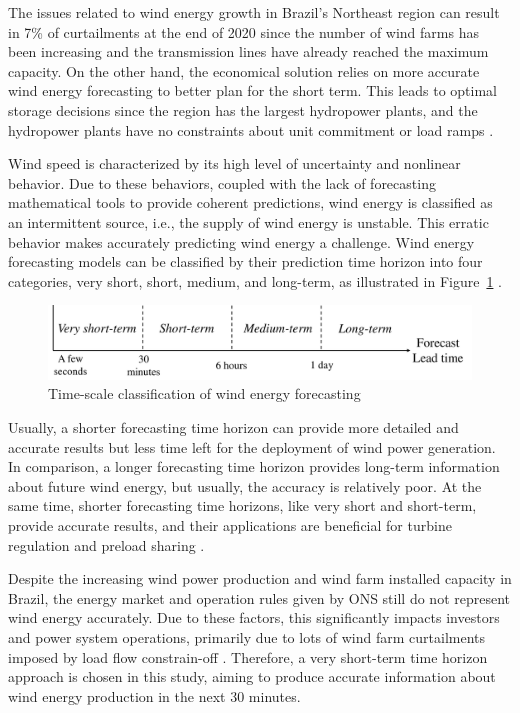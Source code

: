 The issues related to wind energy growth in Brazil's Northeast region can result in 7\% of curtailments at the end of 2020 \cite{jong2017Forecasting} since the number of wind farms has been increasing and the transmission lines have already reached the maximum capacity. On the other hand, the economical solution relies on more accurate wind energy forecasting to better plan for the short term. This leads to optimal storage decisions since the region has the largest hydropower plants, and the hydropower plants have no constraints about unit commitment or load ramps \cite{jong2017Forecasting}.

Wind speed is characterized by its high level of uncertainty and nonlinear behavior. Due to these behaviors, coupled with the lack of forecasting mathematical tools to provide coherent predictions, wind energy is classified as an intermittent source, i.e., the supply of wind energy is unstable. This erratic behavior makes accurately predicting wind energy a challenge. Wind energy forecasting models can be classified by their prediction time horizon into four categories, very short, short, medium, and long-term, as illustrated in Figure~\ref{fig:leadtime} \cite{moreno2019Very}.  

\begin{figure}[!htb]
    \centering
    \includegraphics[width=0.9\linewidth]{Media/cs2_leadtime.pdf}
    \caption{Time-scale classification of wind energy forecasting}
    \label{fig:leadtime}
\end{figure}

Usually, a shorter forecasting time horizon can provide more detailed and accurate results but less time left for the deployment of wind power generation. In comparison, a longer forecasting time horizon provides long-term information about future wind energy, but usually, the accuracy is relatively poor. At the same time, shorter forecasting time horizons, like very short and short-term, provide accurate results, and their applications are beneficial for turbine regulation and preload sharing \cite{liu2019Data}.

Despite the increasing wind power production and wind farm installed capacity in Brazil, the energy market and operation rules given by \ac{ONS} still do not represent wind energy accurately. Due to these factors, this significantly impacts investors and power system operations, primarily due to lots of wind farm curtailments imposed by load flow constrain-off \cite{ribeiro2019Desafio}. Therefore, a very short-term time horizon approach is chosen in this study, aiming to produce accurate information about wind energy production in the next 30 minutes.

